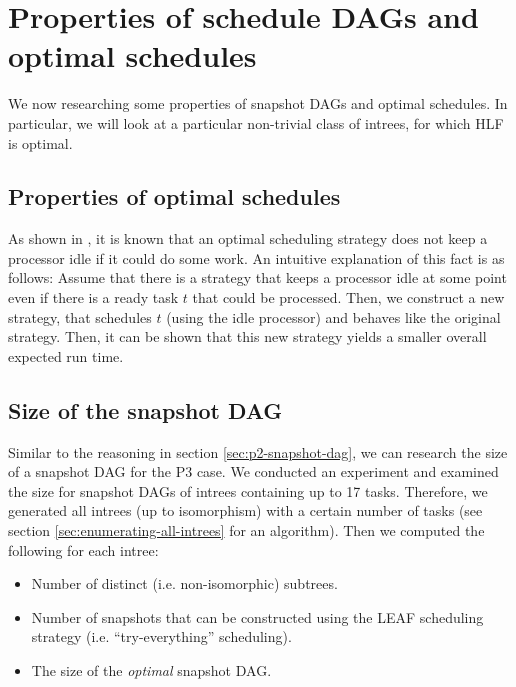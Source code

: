 \chapter{Properties of schedule DAGs and optimal schedules}
\label{chap:p3}

We now researching some properties of snapshot DAGs and optimal schedules. In particular, we will look at a particular non-trivial class of intrees, for which HLF is optimal.

\section{Properties of optimal schedules}
\label{sec:optimal-schedules-properties}

As shown in \cite{chandyreynoldslargepaper1979}, it is known that an optimal scheduling strategy does not keep a processor idle if it could do some work. An intuitive explanation of this fact is as follows: Assume that there is a strategy that keeps a processor idle at some point even if there is a ready task $t$ that could be processed. Then, we construct a new strategy, that schedules $t$ (using the idle processor) and behaves like the original strategy. Then, it can be shown that this new strategy yields a smaller overall expected run time.



\section{Size of the snapshot DAG}
\label{sec:p3-size-of-snapshot-dag-first-attempts}

Similar to the reasoning in section \ref{sec:p2-snapshot-dag}, we can research the size of a snapshot DAG for the P3 case. 
We conducted an experiment and examined the size for snapshot DAGs of intrees containing up to 17 tasks. 
Therefore, we generated all intrees (up to isomorphism) with a certain number of tasks (see section \ref{sec:enumerating-all-intrees} for an algorithm).
Then we computed the following for each intree:
\begin{itemize}
\item Number of distinct (i.e. non-isomorphic) subtrees.
\item Number of snapshots that can be constructed using the LEAF scheduling strategy (i.e. ``try-everything'' scheduling).
\item The size of the \emph{optimal} snapshot DAG.
\end{itemize}


